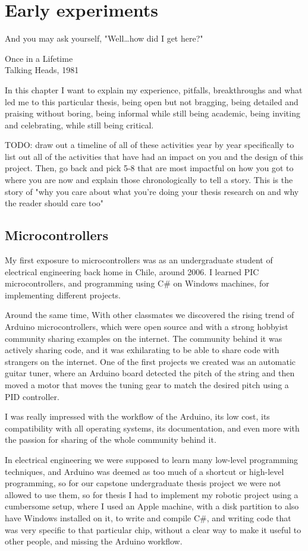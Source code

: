 \chapter{Early experiments}

\epigraph{And you may ask yourself, "Well\dots how did I get here?"}{Once in a Lifetime \\ Talking Heads, 1981}

In this chapter I want to explain my experience, pitfalls, breakthroughs and what led me to this particular thesis, being open but not bragging, being detailed and praising without boring, being informal while still being academic, being inviting and celebrating, while still being critical.

TODO: draw out a timeline of all of these activities year by year specifically to list out all of the activities that have had an impact on you and the design of this project.
Then, go back and pick 5-8 that are most impactful on how you got to where you are now and explain those chronologically to tell a story. This is the story of "why you care about what you're doing your thesis research on and why the reader should care too"

\section{Microcontrollers}

My first exposure to microcontrollers was as an undergraduate student of electrical engineering back home in Chile, around 2006. I learned PIC microcontrollers, and programming using C\# on Windows machines, for implementing different projects.

Around the same time, With other classmates we discovered the rising trend of Arduino microcontrollers, which were open source and with a strong hobbyist community sharing examples on the internet. The community behind it was actively sharing code, and it was exhilarating to be able to share code with strangers on the internet. One of the first projects we created was an automatic guitar tuner, where an Arduino board detected the pitch of the string and then moved a motor that moves the tuning gear to match the desired pitch using a PID controller.

I was really impressed with the workflow of the Arduino, its low cost, its compatibility with all operating systems, its documentation, and even more with the passion for sharing of the whole community behind it.

In electrical engineering we were supposed to learn many low-level programming techniques, and Arduino was deemed as too much of a shortcut or high-level programming, so for our capstone undergraduate thesis project we were not allowed to use them, so for thesis I had to implement my robotic project using a cumbersome setup, where I used an Apple machine, with a disk partition to also have Windows installed on it, to write and compile C\#, and writing code that was very specific to that particular chip, without a clear way to make it useful to other people, and missing the Arduino workflow.

